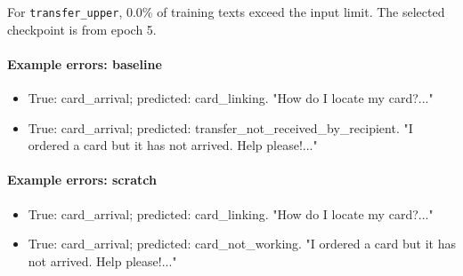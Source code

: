 For \texttt{transfer\_upper}, 0.0\% of training texts exceed the input limit. The selected checkpoint is from epoch 5.

\par\medskip\noindent\begin{minipage}{\linewidth}

\paragraph{Example errors: baseline}

\begin{itemize}

\item True: card\_arrival; predicted: card\_linking. "How do I locate my card?..."

\item True: card\_arrival; predicted: transfer\_not\_received\_by\_recipient. "I ordered a card but it has not arrived. Help please!..."

\end{itemize}

\end{minipage}\par

\par\medskip\noindent\begin{minipage}{\linewidth}

\paragraph{Example errors: scratch}

\begin{itemize}

\item True: card\_arrival; predicted: card\_linking. "How do I locate my card?..."

\item True: card\_arrival; predicted: card\_not\_working. "I ordered a card but it has not arrived. Help please!..."

\end{itemize}

\end{minipage}\par

